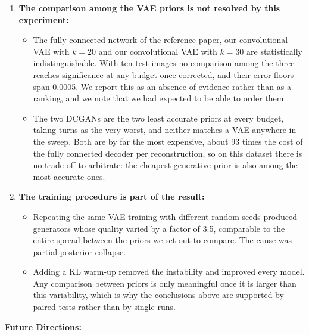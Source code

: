 \begin{enumerate}
\begin{itemize}
    \end{itemize}
    \item \textbf{The comparison among the VAE priors is not resolved by this experiment:}
    \begin{itemize}
        \item The fully connected network of the reference paper, our convolutional VAE with \( k = 20 \) and our convolutional VAE with \( k = 30 \) are statistically indistinguishable. With ten test images no comparison among the three reaches significance at any budget once corrected, and their error floors span 0.0005. We report this as an absence of evidence rather than as a ranking, and we note that we had expected to be able to order them.
        \item The two DCGANs are the two least accurate priors at every budget, taking turns as the very worst, and neither matches a VAE anywhere in the sweep. Both are by far the most expensive, about 93 times the cost of the fully connected decoder per reconstruction, so on this dataset there is no trade-off to arbitrate: the cheapest generative prior is also among the most accurate ones.
    \end{itemize}
    \item \textbf{The training procedure is part of the result:}
    \begin{itemize}
        \item Repeating the same VAE training with different random seeds produced generators whose quality varied by a factor of 3.5, comparable to the entire spread between the priors we set out to compare. The cause was partial posterior collapse.
        \item Adding a KL warm-up removed the instability and improved every model. Any comparison between priors is only meaningful once it is larger than this variability, which is why the conclusions above are supported by paired tests rather than by single runs.
    \end{itemize}
\end{enumerate}

\textbf{Future Directions:}

